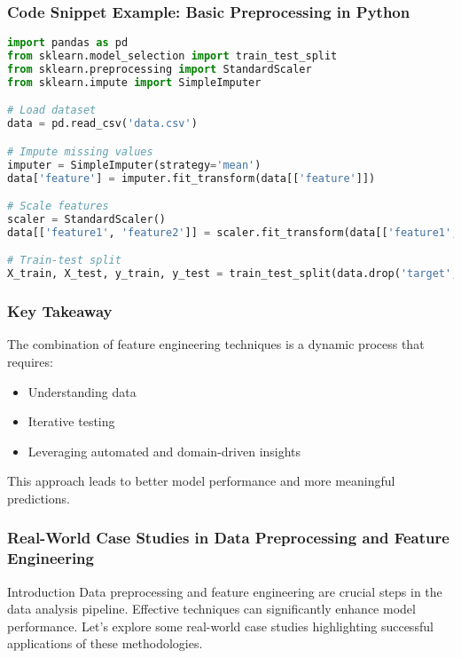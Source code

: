 \documentclass[aspectratio=169]{beamer}
\begin{document}
\begin{frame}[fragile]
  \frametitle{Code Snippet Example: Basic Preprocessing in Python}
  \begin{lstlisting}[language=Python]
import pandas as pd
from sklearn.model_selection import train_test_split
from sklearn.preprocessing import StandardScaler
from sklearn.impute import SimpleImputer

# Load dataset
data = pd.read_csv('data.csv')

# Impute missing values
imputer = SimpleImputer(strategy='mean')
data['feature'] = imputer.fit_transform(data[['feature']])

# Scale features
scaler = StandardScaler()
data[['feature1', 'feature2']] = scaler.fit_transform(data[['feature1', 'feature2']])

# Train-test split
X_train, X_test, y_train, y_test = train_test_split(data.drop('target', axis=1), data['target'], test_size=0.2)
  \end{lstlisting}
\end{frame}

\begin{frame}
  \frametitle{Key Takeaway}
  The combination of feature engineering techniques is a dynamic process that requires:
  \begin{itemize}
    \item Understanding data
    \item Iterative testing
    \item Leveraging automated and domain-driven insights
  \end{itemize}
  This approach leads to better model performance and more meaningful predictions.
\end{frame}

\begin{frame}
    \frametitle{Real-World Case Studies in Data Preprocessing and Feature Engineering}
    \begin{block}{Introduction}
        Data preprocessing and feature engineering are crucial steps in the data analysis pipeline. Effective techniques can significantly enhance model performance. Let's explore some real-world case studies highlighting successful applications of these methodologies.
    \end{block}
\end{frame}
\end{document}
